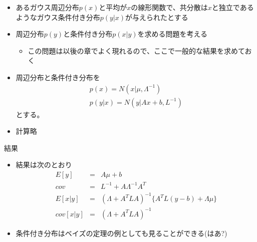 \begin{frame}
 \begin{itemize}
	\item あるガウス周辺分布$p(x)$と平均が$x$の線形関数で、共分散は$x$と独立であるようなガウス条件付き分布$p(y|x)$が与えられたとする
	\item 周辺分布$p(y)$と条件付き分布$p(x|y)$を求める問題を考える
\begin{itemize}
 \item この問題は以後の章でよく現れるので、ここで一般的な結果を求めておく
\end{itemize}
 \end{itemize}
\end{frame}

\begin{frame}
 \begin{itemize}
	\item 周辺分布と条件付き分布を
				 \begin{eqnarray}
					p(x) = N(x|\mu , \Lambda^{-1})\\
					p(y|x) = N(y|Ax+b, L^{-1})
				 \end{eqnarray}
				 とする。
 \end{itemize}
\end{frame}

\begin{frame}
 \begin{itemize}
	\item 計算略
 \end{itemize}
\end{frame}

\begin{frame}{結果}
 \begin{itemize}
	\item 結果は次のとおり
\begin{eqnarray}
 E[y] &= &A\mu +b\\
 cov &=& L^{-1} + A\Lambda^{-1}A^T\\
 E[x|y]& =& (\Lambda+A^TLA)^{-1}\{A^TL(y-b)+\Lambda\mu\}\\
cov[x|y] &= & (\Lambda+A^TLA)^{-1}
\end{eqnarray}
\item 条件付き分布はベイズの定理の例としても見ることができる(はあ?)
 \end{itemize}

\end{frame}
